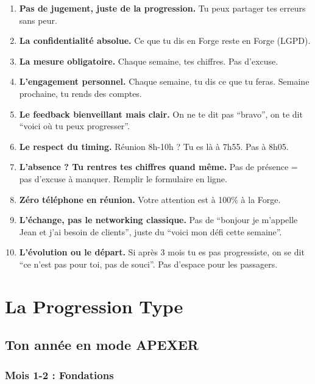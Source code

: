 \documentclass[12pt,a4paper,openany]{book}
\begin{document}
\begin{enumerate}
\item \textbf{Pas de jugement, juste de la progression.} Tu peux partager tes erreurs sans peur.

\item \textbf{La confidentialité absolue.} Ce que tu dis en Forge reste en Forge (LGPD).

\item \textbf{La mesure obligatoire.} Chaque semaine, tes chiffres. Pas d'excuse.

\item \textbf{L'engagement personnel.} Chaque semaine, tu dis ce que tu feras. Semaine prochaine, tu rends des comptes.

\item \textbf{Le feedback bienveillant mais clair.} On ne te dit pas ``bravo'', on te dit ``voici où tu peux progresser''.

\item \textbf{Le respect du timing.} Réunion 8h-10h ? Tu es là à 7h55. Pas à 8h05.

\item \textbf{L'absence ? Tu rentres tes chiffres quand même.} Pas de présence = pas d'excuse à manquer. Remplir le formulaire en ligne.

\item \textbf{Zéro téléphone en réunion.} Votre attention est à 100\% à la Forge.

\item \textbf{L'échange, pas le networking classique.} Pas de ``bonjour je m'appelle Jean et j'ai besoin de clients'', juste du ``voici mon défi cette semaine''.

\item \textbf{L'évolution ou le départ.} Si après 3 mois tu es pas progressiste, on se dit ``ce n'est pas pour toi, pas de souci''. Pas d'espace pour les passagers.
\end{enumerate}

\clearpage

\chapter{La Progression Type}

\section{Ton année en mode APEXER}

\subsection{Mois 1-2 : Fondations}
\end{document}
